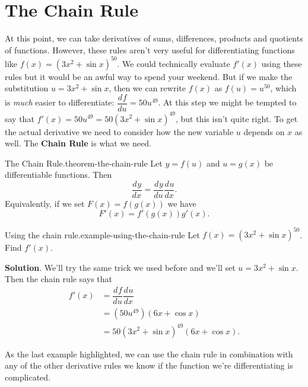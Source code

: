 \documentclass[10pt,]{book}
\newcommand{\terminology}[1]{\textbf{#1}}
\numberwithin{equation}{section}
\newcommand{\dv}[3][]{\dfrac{d^{#1} #2}{d #3^{#1}}}
\begin{document}
\section[{The Chain Rule}]{The Chain Rule}\label{section-the-chain-rule}
\hypertarget{p-149}{}%
At this point, we can take derivatives of sums, differences, products and quotients of functions. However, these rules aren't very useful for differentiating functions like \(f(x) = (3x^{2} + \sin x)^{50}\). We could technically evaluate \(f'(x)\) using these rules but it would be an awful way to spend your weekend. But if we make the substitution \(u = 3x^{2} + \sin x\), then we can rewrite \(f(x)\) as \(f(u) = u^{50}\), which is \emph{much} easier to differentiate: \(\dv{f}{u} = 50u^{49}\). At this step we might be tempted to say that \(f'(x) = 50u^{49} = 50(3x^{2} + \sin x)^{49}\), but this isn't quite right. To get the actual derivative we need to consider how the new variable \(u\) depends on \(x\) as well. The \terminology{Chain Rule} is what we need.%
\begin{theorem}{The Chain Rule.}{}{theorem-the-chain-rule}%
\hypertarget{p-150}{}%
Let \(y = f(u)\) and \(u = g(x)\) be differentiable functions. Then%
\begin{equation*}
\dv{y}{x} = \dv{y}{u}\dv{u}{x}.
\end{equation*}
Equivalently, if we set \(F(x) = f(g(x))\) we have%
\begin{equation*}
F'(x) = f'(g(x))g'(x).
\end{equation*}
%
\end{theorem}
\begin{example}{Using the chain rule.}{example-using-the-chain-rule}%
\hypertarget{p-151}{}%
Let \(f(x) = (3x^{2} + \sin x)^{50}\). Find \(f'(x)\).%
\par\smallskip%
\noindent\textbf{Solution}.\hypertarget{solution-30}{}\quad%
\hypertarget{p-152}{}%
We'll try the same trick we used before and we'll set \(u = 3x^{2} + \sin x\). Then the chain rule says that%
\begin{align*}
f'(x) & =\dv{f}{u}\dv{u}{x} \\
& = (50u^{49})(6x+\cos x) \\
& = 50(3x^{2} + \sin x)^{49}(6x + \cos x). 
\end{align*}
%
\end{example}
\hypertarget{p-153}{}%
As the last example highlighted, we can use the chain rule in combination with any of the other derivative rules we know if the function we're differentiating is complicated.%
\end{document}
